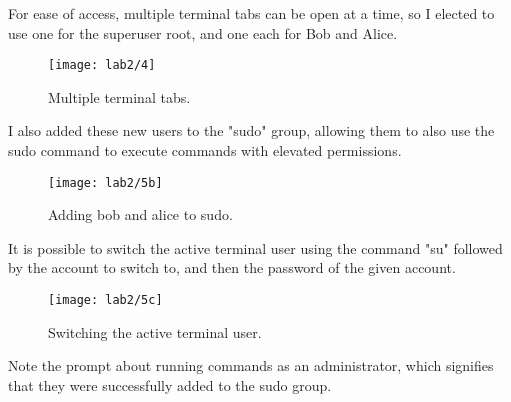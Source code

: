 
For ease of access, multiple terminal tabs can be open at a time, so I elected to use one for the superuser root,
and one each for Bob and Alice.

\begin{figure}[H]
    \centering
    \texttt{[image: lab2/4]}
    \caption{Multiple terminal tabs.}
    \label{fig:terminalTabs}
\end{figure}

I also added these new users to the "sudo" group, allowing them to also use the sudo command to execute commands
with elevated permissions.

\begin{figure}[H]
    \centering
    \texttt{[image: lab2/5b]}
    \caption{Adding bob and alice to sudo.}
    \label{fig:sudoAdd1}
\end{figure}



It is possible to switch the active terminal user using the command "su" followed by the account to switch to,
and then the password of the given account.

\begin{figure}[H]
    \centering
    \texttt{[image: lab2/5c]}
    \caption{Switching the active terminal user.}
    \label{fig:suBobAlice}
\end{figure}

Note the prompt about running commands as an administrator,
which signifies that they were successfully added to the sudo group.


\pagebreak

